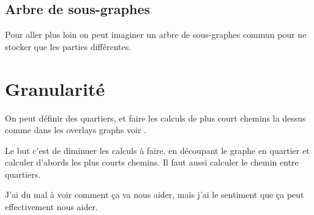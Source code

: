 \documentclass[a4paper]{article}
\begin{document}
  \subsection{Arbre de sous-graphes}

Pour aller plus loin on peut imaginer un arbre de sous-graphes commun pour ne
stocker que les parties différentes.

\section{Granularité}

On peut définir des quartiers, et faire les calculs de plus court chemins la
dessus comme dans les overlays graphs voir \cite{holzer2009}.

Le but c'est de diminuer les calculs à faire, en découpant le graphe en quartier
et calculer d'abords les plus courts chemins. Il faut aussi calculer le chemin
entre quartiers.

J'ai du mal à voir comment ça va nous aider, mais j'ai le sentiment que ça peut
effectivement nous aider.

 
\end{document}
